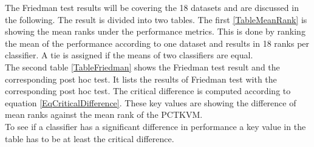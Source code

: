 \begin{table}[t]
	\centering
	\caption[Result of Friedman Test with Bonferroni-Dun as Post-Hoc Test]{The result of the Friedman Test with Bonferroni-Dunn as post-hoc Test to compare classifiers over multiple Datasets. The first column shows the Friedman value, the second the critical difference which is subtracted from the mean ranks. The classifier columns are showing the result of the post-hoc test.\label{TableFriedman}}
\end{table}
The Friedman test results will be covering the 18 datasets and are discussed in the following.
The result is divided into two tables.
The first \ref{TableMeanRank} is showing the mean ranks under the performance metrics.
This is done by ranking the mean of the performance according to one dataset and results in 18 ranks per classifier.
A tie is assigned if the means of two classifiers are equal.\\
The second table \ref{TableFriedman} shows the Friedman test result and the corresponding post hoc test. 
It lists the results of Friedman test with the corresponding post hoc test. The critical difference is computed according to equation \eqref{EqCriticalDifference}.
These key values are showing the difference of mean ranks against the mean rank of the \acs{PCTKVM}.\\
To see if a classifier has a significant difference in performance a key value in the table has to be at least the critical difference.
